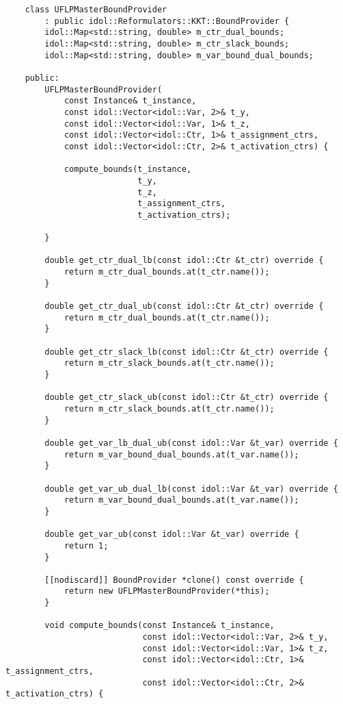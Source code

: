 \begin{lstlisting}
    class UFLPMasterBoundProvider 
        : public idol::Reformulators::KKT::BoundProvider {
        idol::Map<std::string, double> m_ctr_dual_bounds;
        idol::Map<std::string, double> m_ctr_slack_bounds;
        idol::Map<std::string, double> m_var_bound_dual_bounds;

    public:
        UFLPMasterBoundProvider(
            const Instance& t_instance,
            const idol::Vector<idol::Var, 2>& t_y,
            const idol::Vector<idol::Var, 1>& t_z,
            const idol::Vector<idol::Ctr, 1>& t_assignment_ctrs,
            const idol::Vector<idol::Ctr, 2>& t_activation_ctrs) {

            compute_bounds(t_instance, 
                           t_y, 
                           t_z,
                           t_assignment_ctrs,
                           t_activation_ctrs);

        }

        double get_ctr_dual_lb(const idol::Ctr &t_ctr) override {
            return m_ctr_dual_bounds.at(t_ctr.name());
        }

        double get_ctr_dual_ub(const idol::Ctr &t_ctr) override {
            return m_ctr_dual_bounds.at(t_ctr.name());
        }

        double get_ctr_slack_lb(const idol::Ctr &t_ctr) override {
            return m_ctr_slack_bounds.at(t_ctr.name());
        }

        double get_ctr_slack_ub(const idol::Ctr &t_ctr) override {
            return m_ctr_slack_bounds.at(t_ctr.name());
        }

        double get_var_lb_dual_ub(const idol::Var &t_var) override {
            return m_var_bound_dual_bounds.at(t_var.name());
        }

        double get_var_ub_dual_lb(const idol::Var &t_var) override {
            return m_var_bound_dual_bounds.at(t_var.name());
        }

        double get_var_ub(const idol::Var &t_var) override {
            return 1;
        }

        [[nodiscard]] BoundProvider *clone() const override {
            return new UFLPMasterBoundProvider(*this);
        }

        void compute_bounds(const Instance& t_instance,
                            const idol::Vector<idol::Var, 2>& t_y,
                            const idol::Vector<idol::Var, 1>& t_z,
                            const idol::Vector<idol::Ctr, 1>& t_assignment_ctrs,
                            const idol::Vector<idol::Ctr, 2>& t_activation_ctrs) {


\end{lstlisting}
